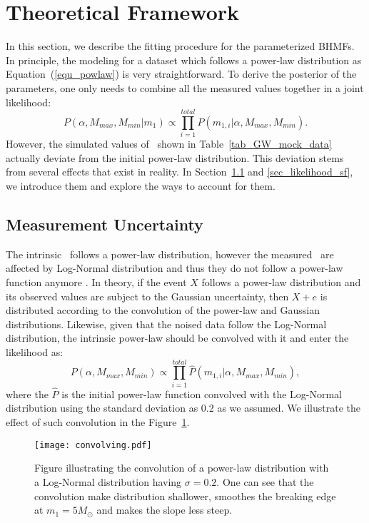\documentclass[twocolumn]{aastex62}
\begin{document}
\section{Theoretical Framework}  \label{sec_theory}
In this section, we describe the fitting procedure for the parameterized BHMFs. 
In principle, the modeling for a dataset which follows a power-law distribution as Equation~(\ref{equ_powlaw}) is very straightforward. To derive the posterior of the parameters, one only needs to combine all the measured values together in a joint likelihood:
 \begin{equation} \label{equ_lik_powlaw}
 P(\alpha, M_{max}, M_{min}|m_{1}) \propto  \prod_{i=1}^{total} P(m_{1,i}|\alpha, M_{max}, M_{min}).
 \end{equation}
However, the simulated values of \mone\ shown in Table~\ref{tab_GW_mock_data} actually deviate from the initial power-law distribution. This deviation stems from several effects that exist in reality. In Section~\ref{sec_likelihood_noise} and \ref{sec_likelihood_sf}, we introduce them and explore the ways to account for them.

\subsection{Measurement Uncertainty}\label{sec_likelihood_noise}
The intrinsic \mone\ follows a power-law distribution, however the measured  \mone\ are affected by Log-Normal distribution and thus they do not follow a power-law function anymore \citep{Koen2009}. In theory, if the event $X$ follows a power-law distribution and its observed values are subject to the Gaussian uncertainty, then $X + e$ is distributed according to the convolution of the power-law and Gaussian distributions. Likewise, given that the noised data follow the Log-Normal distribution, the intrinsic power-law should be convolved with it and enter the likelihood as:
 \begin{equation} \label{equ_lik_conv}
 P(\alpha, M_{max}, M_{min}) \propto  \prod_{i=1}^{total} \hat{P}(m_{1,i}|\alpha, M_{max}, M_{min}),
 \end{equation}
where the $\hat{P}$ is the initial power-law function convolved with the Log-Normal distribution using the standard deviation as 0.2 as we assumed. We illustrate the effect of such convolution in the Figure~\ref{fig:result_slope}.

\begin{figure}%
\texttt{[image: convolving.pdf]}
\caption{
Figure illustrating the convolution of a power-law distribution with a Log-Normal distribution having $\sigma = 0.2$. One can see that the convolution make distribution shallower, smoothes the breaking edge at $m_1 = 5 M_{\odot}$ and makes the slope less steep.
}
\label{fig:result_slope}
\end{figure}
\end{document}
